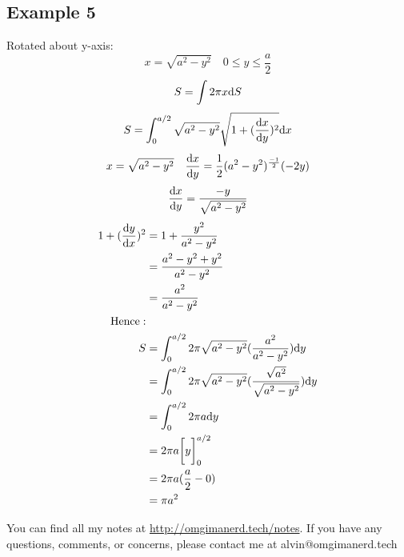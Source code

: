 \documentclass[letterpaper, 12pt]{math}
\begin{document}
\subsection*{Example 5}
Rotated about y-axis:
\[ x = \sqrt{a^{2}-y^{2}} \quad 0 \leq y \leq \frac{a}{2} \]
\[ S = \int{2\pi x\mathrm{d}{S}} \]
\[ S = \int_{0}^{a/2}{
   \sqrt{a^{2}-y^{2}}\sqrt{1+(\frac{\mathrm{d}{x}}{\mathrm{d}{y}})^{2}}\mathrm{d}{x}} \]
\[ x = \sqrt{a^{2}-y^{2}} \quad
   \frac{\mathrm{d}{x}}{\mathrm{d}{y}} = \frac{1}{2}(a^{2}-y^{2})^{\frac{-1}{2}}(-2y) \]
\[ \frac{\mathrm{d}{x}}{\mathrm{d}{y}} = \frac{-y}{\sqrt{a^{2}-y^{2}}} \]
\begin{align*}
  1+(\frac{\mathrm{d}{y}}{\mathrm{d}{x}})^{2} &=
    1+\frac{y^{2}}{a^{2}-y^{2}} \\
  &= \frac{a^{2}-y^{2}+y^{2}}{a^{2}-y^{2}} \\
  &= \frac{a^{2}}{a^{2}-y^{2}} \\
  \mathrm{Hence:} \\
  S &= \int_{0}^{a/2}{
    2\pi\sqrt{a^{2}-y^{2}}(\frac{a^{2}}{a^{2}-y^{2}})\mathrm{d}{y}} \\
  &= \int_{0}^{a/2}{
    2\pi\sqrt{a^{2}-y^{2}}(\frac{\sqrt{a^{2}}}{\sqrt{a^{2}-y^{2}}})\mathrm{d}{y}} \\
  &= \int_{0}^{a/2}{2\pi a\mathrm{d}{y}} \\
  &= 2\pi a\bigg[y\bigg]_{0}^{a/2} \\
  &= 2\pi a(\frac{a}{2}-0) \\
  &= \pi a^{2}
\end{align*}

\begin{center}
  You can find all my notes at \url{http://omgimanerd.tech/notes}. If you have
  any questions, comments, or concerns, please contact me at
  alvin@omgimanerd.tech
\end{center}
\end{document}
